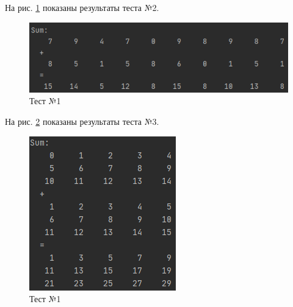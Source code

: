 На рис. \ref{sum2} показаны результаты теста №2.

\begin{figure}[hpt!]
	\centering
	\includegraphics[width=0.6\linewidth]{photo/sum2(10x1)}
	\caption{Тест №1}
	\label{sum2}
\end{figure}

\newpage

На рис. \ref{sum3} показаны результаты теста №3.

\begin{figure}[hpt!]
	\centering
	\includegraphics[width=0.6\linewidth]{photo/sum3(5x3)}
	\caption{Тест №1}
	\label{sum3}
\end{figure}